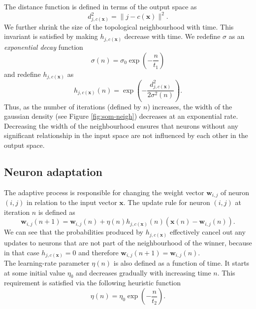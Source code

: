 \documentclass[english]{lni}
\begin{document}
The distance function is defined in terms of the output space as 
\begin{equation}
    d_{j, c(\mathbf{x})}^{2} = \|j-c(\mathbf{x})\|^{2}.
\end{equation}
We further shrink the size of the topological neighbourhood with time. 
This invariant is satisfied by making $h_{j, c(\mathbf{x})}$ decrease with time.
We redefine $\sigma$ as an \textit{exponential decay} function 
\begin{equation}
    \sigma(n) = \sigma_{0}\exp({-\frac{n}{t_{1}}})
\end{equation}
and redefine $h_{j, c(\mathbf{x})}$ as 
\begin{equation}
    h_{j, c(\mathbf{x})}(n) = \exp({-\frac{{d_{j, c(\mathbf{x})}^{2}}}{2\sigma^{2}(n)}}).
\end{equation}
Thus, as the number of iterations (defined by $n$) increases, the width of the 
gaussian density (see Figure \ref{fig:som-neigh}) decreases at an exponential rate.
Decreasing the width of the neighbourhood ensures that neurons without any significant relationship in the input space 
are not influenced by each other in the output space. 
\subsection{Neuron adaptation}
The adaptive process is responsible for changing the weight vector $\mathbf{w}_{i, j}$ 
of neuron $(i, j)$ in relation to the input vector $\mathbf{x}$. The update rule 
for neuron $(i, j)$ at iteration $n$ is defined as
\begin{equation}
    \label{eq:som-update}
    \mathbf{w}_{i, j}(n + 1) = \mathbf{w}_{i, j}(n) + \eta(n)h_{j, c(\mathbf{x})}(n)(\mathbf{x}(n)-\mathbf{w}_{i, j}(n)).
\end{equation}
We can see that the probabilities produced by $h_{j, c(\mathbf{x})}$ effectively 
cancel out any updates to neurons that are not part of the neighbourhood of the winner, because in that case 
$h_{j, c(\mathbf{x})} = 0$ and therefore $\mathbf{w}_{i, j}(n + 1) = \mathbf{w}_{i, j}(n)$.\\
The learning-rate parameter $\eta(n)$ is also defined as a function of time.
It starts at some initial value $\eta_{0}$ and decreases gradually with 
increasing time $n$. This requirement is satisfied via the following heuristic function 
\begin{equation}
    \eta(n) = \eta_{0}\exp({-\frac{n}{t_{2}}}).
\end{equation}
\end{document}
